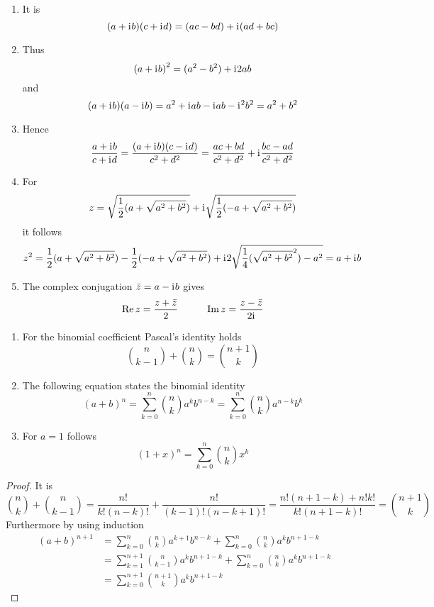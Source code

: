 \begin{lemma}\hfill
	\begin{enumerate}
		\item It is
		      \[
			      (a + \mathrm{i}\mkern1mu b) (c + \mathrm{i}\mkern1mu d) = (ac - bd) + \mathrm{i}\mkern1mu (ad + bc)
		      \]
		\item Thus
		      \[
			      {(a + \mathrm{i}\mkern1mu b)}^2 = (a^2 - b^2) + \mathrm{i}\mkern1mu 2ab
		      \]
		      and
		      \[
			      (a + \mathrm{i}\mkern1mu b) (a - \mathrm{i}\mkern1mu b) =  a^2 + \mathrm{i}\mkern1mu ab - \mathrm{i}\mkern1mu ab - \mathrm{i}\mkern1mu^2b^2 = a^2 + b^2
		      \]
		\item Hence
		      \[
			      \frac{a + \mathrm{i}\mkern1mu b}{c + \mathrm{i}\mkern1mu d} = \frac{(a + \mathrm{i}\mkern1mu b)(c - \mathrm{i}\mkern1mu d)}{c^2 + d^2} =
			      \frac{ac + bd}{c^2 + d^2} + \mathrm{i}\mkern1mu \frac{bc - ad}{c^2 + d^2}
		      \]
		\item For
		      \[
			      z = \sqrt{\frac{1}{2}(a + \sqrt{a^2 + b^2})} + \mathrm{i}\mkern1mu \sqrt{\frac{1}{2}(-a + \sqrt{a^2 + b^2})}
		      \]
		      it follows
		      \[
			      z^2 = \frac{1}{2}(a + \sqrt{a^2 + b^2}) - \frac{1}{2}(-a + \sqrt{a^2 + b^2}) +
			      \mathrm{i}\mkern1mu 2\sqrt{\frac{1}{4} (\sqrt{a^2 + b^2}^2) - a^2} = a + \mathrm{i}\mkern1mu b
		      \]
		\item The complex conjugation \( \bar{z} = a - \mathrm{i}\mkern1mu b \) gives
		      \[
			      \operatorname{Re} z = \frac{z + \bar{z}}{2} \mspace{50mu} \operatorname{Im} z = \frac{z - \bar{z}}{2\mathrm{i}\mkern1mu}
		      \]
	\end{enumerate}
\end{lemma}
\bigskip


\begin{lemma}\hfill
	\begin{enumerate}
		\item For the binomial coefficient Pascal's identity holds
		      \[
			      \binom{n}{k - 1} + \binom{n}{k} = \binom{n + 1 }{k }
		      \]
		\item The following equation states the binomial identity
		      \[
			      {(a + b)}^n = \sum_{k=0}^{n} \binom{n}{k} a^{k} b^{n - k} = \sum_{k=0}^{n} \binom{n}{k} a^{n -k} b^{k}
		      \]
		\item For \( a = 1 \) follows
		      \[
			      {(1 + x)}^n = \sum_{k=0}^{n} \binom{n}{k} x^{k}
		      \]
	\end{enumerate}
\end{lemma}

\begin{proof}
	It is
	\[
		\binom{n}{k} + \binom{n}{k - 1} = \frac{n!}{k!(n - k)!} + \frac{n!}{(k - 1)!(n - k + 1)!}
		= \frac{n!(n + 1 - k) + n!k!}{k!(n + 1- k)!} = \binom{n + 1}{k}
	\]
	Furthermore by using induction
	\[
		\begin{split}
			{(a + b)}^{n + 1}	& = \sum_{k=0}^{n} \binom{n}{k} a^{k + 1} b^{n - k} +
			\sum_{k=0}^{n} \binom{n}{k} a^{k} b^{n + 1 - k} \\
			& = \sum_{k=1}^{n + 1} \binom{n}{k - 1} a^{k} b^{n + 1 - k} +
			\sum_{k=0}^{n} \binom{n}{k} a^{k} b^{n + 1 - k} \\
			& = \sum_{k=0}^{n + 1} \binom{n + 1}{k} a^{k} b^{n + 1 - k}
		\end{split}
	\]
\end{proof}
\bigskip



